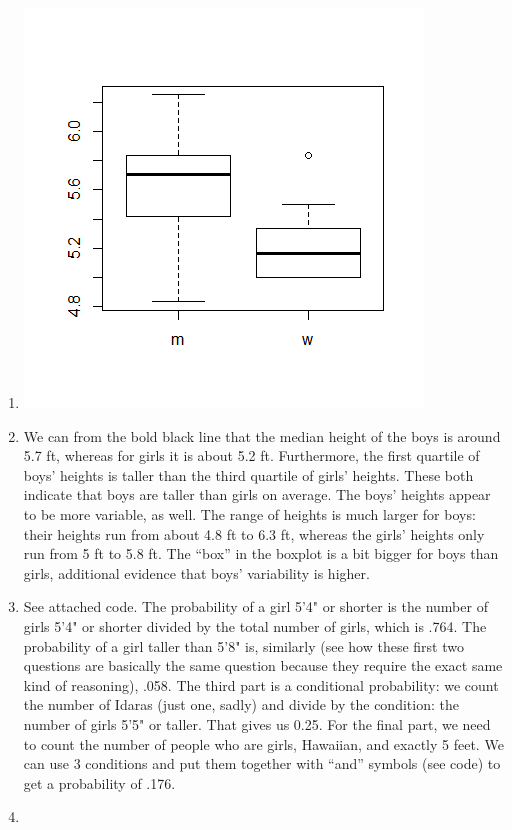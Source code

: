 \documentclass[12pt]{article}
\begin{document}
\begin{enumerate}
	\item \includegraphics{hw5boxplot}
	\item We can from the bold black line that the median height of the boys is around 5.7 ft, whereas for girls it is about 5.2 ft. Furthermore, the first quartile of boys' heights is taller than the third quartile of girls' heights. These both indicate that boys are taller than girls on average. The boys' heights appear to be more variable, as well. The range of heights is much larger for boys: their heights run from about 4.8 ft to 6.3 ft, whereas the girls' heights only run from 5 ft to 5.8 ft. The ``box'' in the boxplot is a bit bigger for boys than girls, additional evidence that boys' variability is higher.
	\item See attached code. The probability of a girl 5'4" or shorter is the number of girls 5'4" or shorter divided by the total number of girls, which is .764. The probability of a girl taller than 5'8" is, similarly (see how these first two questions are basically the same question because they require the exact same kind of reasoning), .058. The third part is a conditional probability: we count the number of Idaras (just one, sadly) and divide by the condition: the number of girls 5'5" or taller. That gives us 0.25. For the final part, we need to count the number of people who are girls, Hawaiian, and exactly 5 feet. We can use 3 conditions and put them together with ``and'' symbols (see code) to get a probability of .176.
	\item
		\begin{enumerate}

\end{enumerate}
\end{enumerate}
\end{document}
